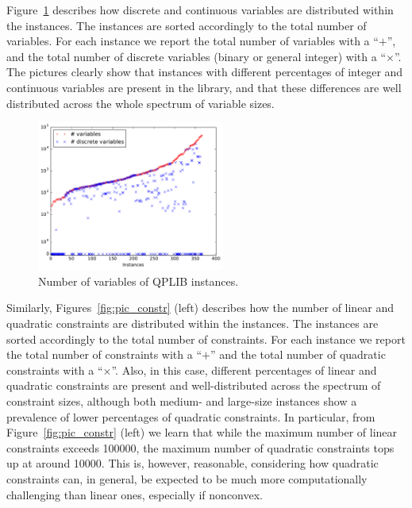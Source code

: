 Figure~\ref{fig:pic_var} 
describes how discrete and continuous
variables are distributed within the instances. The instances are
sorted accordingly to the total number of variables.
For each instance we report the total number of variables with a ``$+$'', and the total number of discrete variables (binary or general integer) with a ``$\times$''. The pictures clearly show that instances with different percentages of integer and continuous variables are present in the library, and that these differences are well distributed across the whole spectrum of variable sizes.

\begin{figure}\centering
  \includegraphics[width=0.55\textwidth]{pic_var.pdf}
  \caption{Number of variables of QPLIB instances. \label{fig:pic_var}}
\end{figure}

Similarly, Figures~\ref{fig:pic_constr} (left)
describes how the number of linear and quadratic
constraints are distributed within the instances. The instances are sorted
accordingly to the total number of constraints.
For each instance we report the total number of constraints with a ``$+$''
and the total number of quadratic constraints
with a ``$\times$''. Also, in this case, different percentages of linear and
quadratic constraints are present and well-distributed across the spectrum
of constraint sizes, although both medium- and large-size instances show a
prevalence of lower percentages of quadratic constraints. In particular,
from Figure~\ref{fig:pic_constr} (left) we learn that while the maximum number
of linear constraints exceeds 100000, the maximum number of quadratic
constraints tops up at around 10000. This is, however, reasonable, considering
how quadratic constraints can, in general, be expected to be much more
computationally challenging than linear ones, especially if nonconvex.

